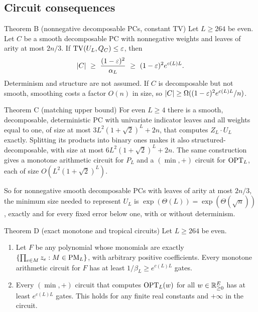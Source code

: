 \subsection{Circuit consequences}

\begin{named}{Theorem B (nonnegative decomposable PCs, constant TV)}
Let $L\ge264$ be even. Let $C$ be a smooth decomposable PC with nonnegative weights and leaves of arity at most $2n/3$. If $\mathrm{TV}(U_L,Q_C)\le\varepsilon$, then
\[
  \abs C\ \ge\ \frac{(1-\eps)^2}{\alpha_L}\ \ge\ (1-\eps)^2e^{c(L)L}.
\]
Determinism and structure are not assumed. If $C$ is decomposable but not smooth, smoothing costs a factor $O(n)$ in size, so $\lvert C\rvert\ge\Omega((1-\varepsilon)^2e^{c(L)L}/n)$.
\end{named}

\begin{named}{Theorem C (matching upper bound)}
For even $L\ge4$ there is a smooth, decomposable, deterministic PC with univariate indicator leaves and all weights equal to one, of size at most $3L^2(1+\sqrt2)^L+2n$, that computes $Z_L\cdot U_L$ exactly. Splitting its products into binary ones makes it also structured-decomposable, with size at most $6L^2(1+\sqrt2)^L+2n$. The same construction gives a monotone arithmetic circuit for $P_L$ and a $(\min,+)$ circuit for $\mathrm{OPT}_L$, each of size $O(L^2(1+\sqrt2)^L)$.
\end{named}

So for nonnegative smooth decomposable PCs with leaves of arity at most $2n/3$, the minimum size needed to represent $U_L$ is $\exp(\Theta(L))=\exp(\Theta(\sqrt n))$, exactly and for every fixed error below one, with or without determinism.

\begin{named}{Theorem D (exact monotone and tropical circuits)}
Let $L\ge264$ be even.
\begin{enumerate}[label=(\roman*)]
\item Let $F$ be any polynomial whose monomials are exactly $\{\prod_{e\in M}z_e:M\in\mathrm{PM}_L\}$, with arbitrary positive coefficients. Every monotone arithmetic circuit for $F$ has at least $1/\beta_L\ge e^{c(L)L}$ gates.
\item Every $(\min,+)$ circuit that computes $\mathrm{OPT}_L(w)$ for all $w\in\mathbb{R}_{\ge0}^E$ has at least $e^{c(L)L}$ gates. This holds for any finite real constants and $+\infty$ in the circuit.
\end{enumerate}
\end{named}

